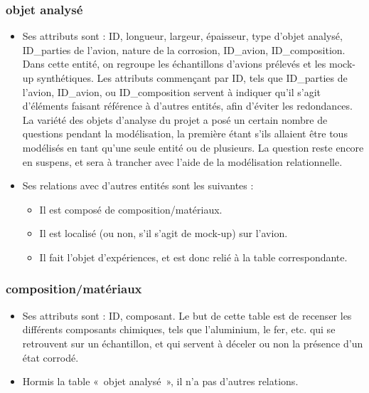 \subsubsection{objet analysé}
 \begin{itemize}
    \item Ses attributs sont : ID, longueur, largeur, épaisseur, type d'objet analysé, ID\_parties de l'avion, nature de la corrosion, ID\_avion, ID\_composition. Dans cette entité, on regroupe les échantillons d’avions prélevés et les mock-up synthétiques. Les attributs commençant par ID, tels que ID\_parties de l'avion, ID\_avion, ou ID\_composition servent à indiquer qu’il s’agit d’éléments faisant référence à d’autres entités, afin d’éviter les redondances. La variété des objets d’analyse du projet a posé un certain nombre de questions pendant la modélisation, la première étant s’ils allaient être tous modélisés en tant qu’une seule entité ou de plusieurs. La question reste encore en suspens, et sera à trancher avec l’aide de la modélisation relationnelle.
    \item Ses relations avec d’autres entités sont les suivantes :
    \begin{itemize}
        \item Il est composé de composition/matériaux.
        \item Il est localisé (ou non, s’il s’agit de mock-up) sur l'avion.
        \item Il fait l'objet d’expériences, et est donc relié à la table correspondante.
    \end{itemize}
\end{itemize}
\subsubsection{composition/matériaux}
 \begin{itemize}    
	\item Ses attributs sont : ID, composant. Le but de cette table est de recenser les différents composants chimiques, tels que l’aluminium, le fer, etc. qui se retrouvent sur un échantillon, et qui servent à déceler ou non la présence d’un état corrodé.
	\item Hormis la table « objet analysé », il n’a pas d’autres relations.
\end{itemize}
